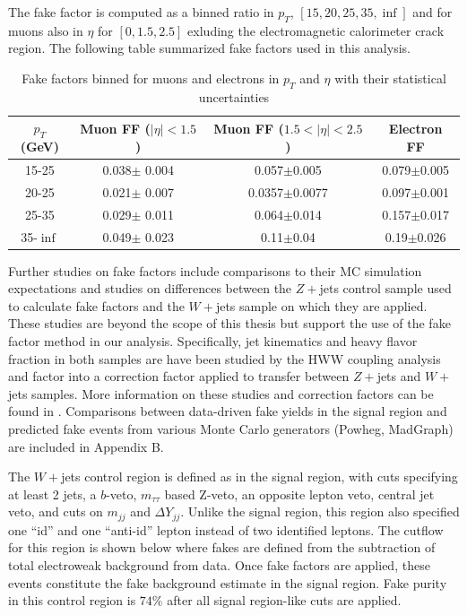 The fake factor is computed as a binned ratio in $p_T$, $[15,20,25,35,\inf]$ and for muons also in $\eta$ for $[0,1.5,2.5]$ exluding the electromagnetic calorimeter crack region. The following table summarized fake factors used in this analysis.

\begin{table}[tb]
\centering
\caption{Fake factors binned for muons and electrons in $p_T$ and $\eta$ with their statistical uncertainties}
\label{tab:FakeFactors}
\begin{tabular}{c|c|c|c}
$p_T$(GeV) & Muon FF ($|\eta|<1.5$) & Muon FF ($1.5<|\eta|<2.5$) & Electron FF \\
\hline
15-25 & 0.038$\pm$ 0.004 & 0.057$\pm$0.005 & 0.079$\pm$0.005 \\
20-25 & 0.021$\pm$ 0.007 & 0.0357$\pm$0.0077 & 0.097$\pm$0.001 \\
25-35 & 0.029$\pm$ 0.011 & 0.064$\pm$0.014 & 0.157$\pm$0.017 \\
35-$\inf$ & 0.049$\pm$ 0.023 & 0.11$\pm$0.04 & 0.19$\pm$0.026 \\
\end{tabular}
\end{table}

Further studies on fake factors include comparisons to their MC simulation expectations and studies on differences between the $Z+$jets control sample used to calculate fake factors and the $W+$jets sample on which they are applied. These studies are beyond the scope of this thesis but support the use of the fake factor method in our analysis. Specifically, jet kinematics and heavy flavor fraction in both samples are have been studied by the HWW coupling analysis and factor into a correction factor applied to transfer between $Z+$jets and $W+$jets samples. More information on these studies and correction factors can be found in \cite{HWWCoupling}. Comparisons between data-driven fake yields in the signal region and predicted fake events from various Monte Carlo generators (Powheg, MadGraph) are included in Appendix B.

The $W+$jets control region is defined as in the signal region, with cuts specifying at least 2 jets, a $b$-veto, $m_{\tau\tau}$ based Z-veto, an opposite lepton veto, central jet veto, and cuts on $m_{jj}$ and $\Delta Y_{jj}$. Unlike the signal region, this region also specified one ``id'' and one ``anti-id'' lepton instead of two identified leptons. The cutflow for this region is shown below where fakes are defined from the subtraction of total electroweak background from data. Once fake factors are applied, these events constitute the fake background estimate in the signal region. Fake purity in this control region is $74\%$ after all signal region-like cuts are applied.

